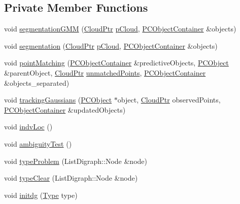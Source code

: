 \subsection*{\-Private \-Member \-Functions}
\begin{DoxyCompactItemize}
\item 
void \hyperlink{class_p_c_tracking_aebe4039992fcd7f206f767237452161d}{segmentation\-G\-M\-M} (\hyperlink{common_8h_a36884aa4a3c181fa4c284d79329ad166}{\-Cloud\-Ptr} \hyperlink{class_p_c_tracking_a681c74d181ddbdd09e58093c6467d690}{p\-Cloud}, \hyperlink{class_p_c_object_container}{\-P\-C\-Object\-Container} \&objects)
\item 
void \hyperlink{class_p_c_tracking_a902fdb88398522511794fa0582dcf72f}{segmentation} (\hyperlink{common_8h_a36884aa4a3c181fa4c284d79329ad166}{\-Cloud\-Ptr} \hyperlink{class_p_c_tracking_a681c74d181ddbdd09e58093c6467d690}{p\-Cloud}, \hyperlink{class_p_c_object_container}{\-P\-C\-Object\-Container} \&objects)
\item 
void \hyperlink{class_p_c_tracking_a0d46f3f2470c6e3e4337a3dbecf9e0e0}{point\-Matching} (\hyperlink{class_p_c_object_container}{\-P\-C\-Object\-Container} \&predictive\-Objects, \hyperlink{class_p_c_object}{\-P\-C\-Object} \&parent\-Object, \hyperlink{common_8h_a36884aa4a3c181fa4c284d79329ad166}{\-Cloud\-Ptr} \hyperlink{class_p_c_tracking_ade7cb8fd4d872bb9eda66ae2f1a264be}{unmatched\-Points}, \hyperlink{class_p_c_object_container}{\-P\-C\-Object\-Container} \&objects\-\_\-separated)
\item 
void \hyperlink{class_p_c_tracking_a6b959016b6a593d1774e91100ad3320c}{tracking\-Gaussians} (\hyperlink{class_p_c_object}{\-P\-C\-Object} $\ast$object, \hyperlink{common_8h_a36884aa4a3c181fa4c284d79329ad166}{\-Cloud\-Ptr} observed\-Points, \hyperlink{class_p_c_object_container}{\-P\-C\-Object\-Container} \&updated\-Objects)
\item 
void \hyperlink{class_p_c_tracking_a97860708be23118c47c835d072bb6974}{indv\-Loc} ()
\item 
void \hyperlink{class_p_c_tracking_a09806f996a08724b25790803859bc379}{ambiguity\-Test} ()
\item 
void \hyperlink{class_p_c_tracking_aec7386845e746c4d430c674e85b64c1c}{type\-Problem} (\-List\-Digraph\-::\-Node \&node)
\item 
void \hyperlink{class_p_c_tracking_ad0d1aeae2dba8a15938269fda650fd44}{type\-Clear} (\-List\-Digraph\-::\-Node \&node)
\item 
void \hyperlink{class_p_c_tracking_a2acf2c4ee72aa0312f6120ab86aec5bc}{initdg} (\hyperlink{pctracking_8h_a1d1cfd8ffb84e947f82999c682b666a7}{\-Type} type)

\end{DoxyCompactItemize}
